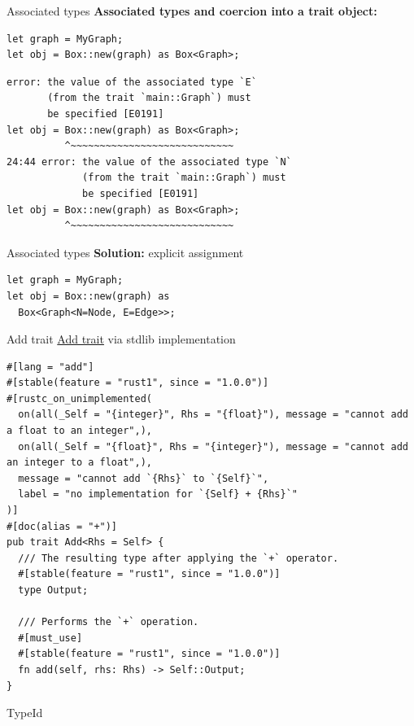 \documentclass{beamer}
\begin{document}
\begin{frame}[fragile]{Associated types}
  \textbf{Associated types and coercion into a trait object:}

  \begin{verbatim}
let graph = MyGraph;
let obj = Box::new(graph) as Box<Graph>;
  \end{verbatim}

  \begin{verbatim}
error: the value of the associated type `E`
       (from the trait `main::Graph`) must
       be specified [E0191]
let obj = Box::new(graph) as Box<Graph>;
          ^~~~~~~~~~~~~~~~~~~~~~~~~~~~~
24:44 error: the value of the associated type `N`
             (from the trait `main::Graph`) must
             be specified [E0191]
let obj = Box::new(graph) as Box<Graph>;
          ^~~~~~~~~~~~~~~~~~~~~~~~~~~~~
\end{verbatim}
\end{frame}

\begin{frame}[fragile]{Associated types}
  \textbf{Solution:} explicit assignment
  \begin{verbatim}
let graph = MyGraph;
let obj = Box::new(graph) as
  Box<Graph<N=Node, E=Edge>>;
\end{verbatim}
\end{frame}

\begin{frame}[fragile]{Add trait}
  \href{https://doc.rust-lang.org/src/core/ops/arith.rs.html#66}{Add trait} via stdlib implementation
  \begin{verbatim}
#[lang = "add"]
#[stable(feature = "rust1", since = "1.0.0")]
#[rustc_on_unimplemented(
  on(all(_Self = "{integer}", Rhs = "{float}"), message = "cannot add a float to an integer",),
  on(all(_Self = "{float}", Rhs = "{integer}"), message = "cannot add an integer to a float",),
  message = "cannot add `{Rhs}` to `{Self}`",
  label = "no implementation for `{Self} + {Rhs}`"
)]
#[doc(alias = "+")]
pub trait Add<Rhs = Self> {
  /// The resulting type after applying the `+` operator.
  #[stable(feature = "rust1", since = "1.0.0")]
  type Output;

  /// Performs the `+` operation.
  #[must_use]
  #[stable(feature = "rust1", since = "1.0.0")]
  fn add(self, rhs: Rhs) -> Self::Output;
}
\end{verbatim}
\end{frame}

\begin{frame}[standout]
  TypeId
\end{frame}
\end{document}
